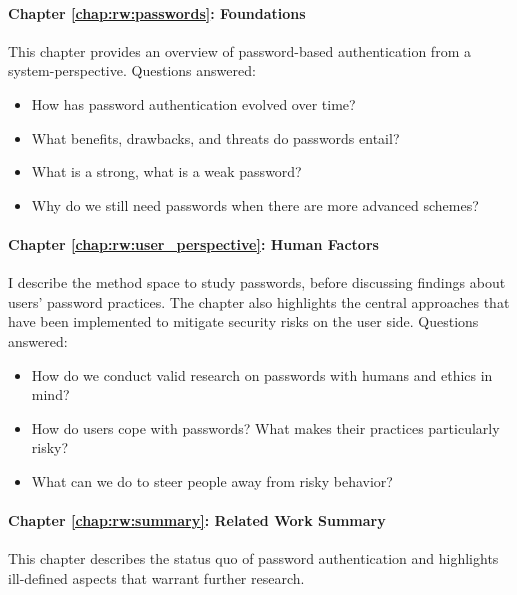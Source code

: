 \paragraph{Chapter \ref{chap:rw:passwords}: Foundations} %
This chapter provides an overview of password-based authentication from a system-perspective. 
Questions answered: \vspace*{-5pt} \begin{itemize}[leftmargin=*,itemsep=-5pt]
	\item How has password authentication evolved over time?
	\item What benefits, drawbacks, and threats do passwords entail?
	\item What is a strong, what is a weak password?
	\item Why do we still need passwords when there are more advanced schemes?
\end{itemize}

\paragraph{Chapter \ref{chap:rw:user_perspective}: Human Factors} %
I describe the method space to study passwords, before discussing findings about users' password practices. The chapter also highlights the central approaches that have been implemented to mitigate security risks on the user side. 
Questions answered: \vspace*{-5pt} \begin{itemize}[leftmargin=*,itemsep=-5pt]
	\item How do we conduct valid research on passwords with humans and ethics in mind?
	\item How do users cope with passwords? What makes their practices particularly risky?
	\item What can we do to steer people away from risky behavior? 
\end{itemize}

\paragraph{Chapter \ref{chap:rw:summary}: Related Work Summary} This chapter describes the status quo of password authentication and highlights ill-defined aspects that warrant further research.


